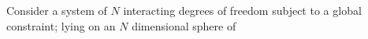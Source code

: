 Consider a system of $N$ interacting degrees of freedom subject to a global constraint; lying on an $N$ dimensional sphere of 